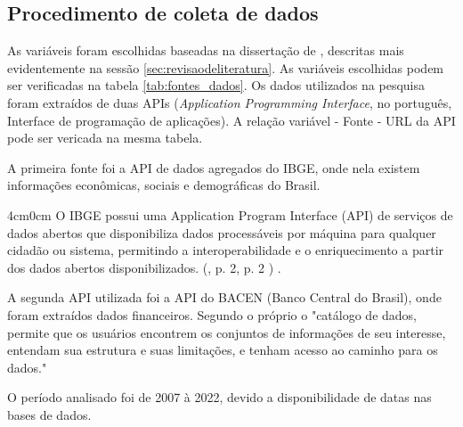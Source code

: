 \documentclass[12pt]{article}%
\newcommand{\citem}[2][]{%
	(\citeauthoronline{#2}, \citeyear{#2}%
	\ifx#1\empty\else, #1\fi%
	)%
}
\newenvironment{ABNTQuote}
{\begin{adjustwidth}{4cm}{0cm}\fontsize{10pt}{12pt}\selectfont\justifying\singlespacing}
	{\end{adjustwidth}\par\normalfont\normalsize\justifying}
\begin{document}
	
	\subsection{Procedimento de coleta de dados}
	
	As variáveis foram escolhidas baseadas na dissertação de , descritas mais evidentemente na sessão \ref{sec:revisaodeliteratura}. As variáveis escolhidas podem ser verificadas na tabela \ref{tab:fontes_dados}. Os dados utilizados na pesquisa foram extraídos de duas APIs (\textit{Application Programming Interface}, no português, Interface de programação de aplicações). A relação variável - Fonte - URL da API pode ser vericada na mesma tabela.
	
	A primeira fonte foi a API de dados agregados do IBGE, onde nela existem informações econômicas, sociais e demográficas do Brasil. 
	
	
	\begin{ABNTQuote}
		O IBGE possui uma Application Program Interface (API) de serviços de dados abertos que disponibiliza dados processáveis por máquina para qualquer cidadão ou sistema, permitindo a interoperabilidade e o enriquecimento a partir dos dados abertos disponibilizados. \citem[p. 2]{silva2024dados}.
	\end{ABNTQuote}

	A segunda API utilizada foi a API do BACEN (Banco Central do Brasil), onde foram extraídos dados financeiros. Segundo o próprio  o "catálogo de dados, permite que os usuários encontrem os conjuntos de informações de seu interesse, entendam sua estrutura e suas limitações, e tenham acesso ao caminho para os dados."
	
	O período analisado foi de 2007 à 2022, devido a disponibilidade de datas nas bases de dados. 
	
\end{document}
